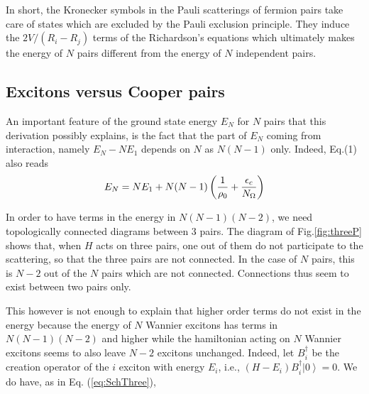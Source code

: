 \documentclass[aps,prb,superscriptaddress,showpacs,reprint,lengthcheck]{revtex4}
\begin{document}
In short, the Kronecker symbols in the Pauli scatterings of fermion pairs
take care of states which are excluded by the Pauli exclusion principle. They induce the $2V/(R_i-R_j)$ terms
of the Richardson's equations which ultimately makes the energy of $N$ pairs different
from the energy of $N$ independent pairs.

\subsection{Excitons versus Cooper pairs}

An important feature of the ground state energy $E _N$ for $N$ pairs that
this  derivation possibly explains, is the fact that the
part of $E_N$ coming from interaction, namely $E _N-N%
E _1$ depends on $N$ as $N(N-1)$ only. Indeed, Eq.(1)  also reads
\begin{equation}  \label{eq:en}
E _N=NE _1+N(N-1)\left(\frac{1}{\rho_0} +\frac{\epsilon_c}{%
N_\Omega}\right) 
\end{equation}

In order to have terms in the energy in $N(N-1)(N-2)$, we need topologically connected
diagrams between 3 pairs. The diagram of Fig.\ref{fig:threeP} shows that, when $H$ acts on three pairs, one out of them do not participate to the scattering, so that the three pairs are not connected. In the case of $N$ pairs, this is $N-2$ out of the $N$ pairs which are not connected. Connections thus seem to exist between two pairs only. 

This however is not enough to explain that higher order terms do not exist in the energy because the energy of $N$ Wannier excitons has terms in $N(N-1)(N-2)$ and higher\cite{monicOdil}  while the hamiltonian acting on $N$ Wannier excitons seems to also leave $N-2$ excitons unchanged. Indeed, let $B_i^\dagger$ be the creation operator of the $i$ exciton with energy $E_i$, i.e., $(H-E_i)B^\dagger_i\left|0\right>=0$.  We do have, as in Eq. (\ref{eq:SchThree}), 
\end{document}
